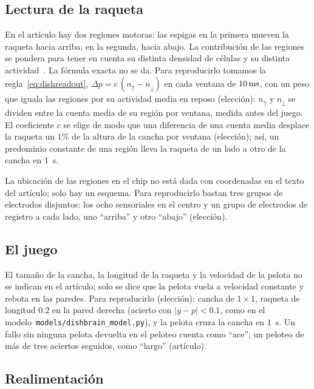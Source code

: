\subsection*{Lectura de la raqueta}

En el artículo hay dos regiones motoras: las espigas en la primera mueven la raqueta hacia arriba; en la segunda, hacia abajo. La contribución de las regiones se pondera para tener en cuenta su distinta densidad de células y su distinta actividad~\cite{Kagan2022}. La fórmula exacta no se da. Para reproducirlo tomamos la regla~\eqref{eq:dishreadout}, $\Delta p=c\,(n_\uparrow-n_\downarrow)$ en cada ventana de $10\,\text{ms}$, con un peso que iguala las regiones por su actividad media en reposo (elección): $n_\uparrow$ y $n_\downarrow$ se dividen entre la cuenta media de su región por ventana, medida antes del juego. El coeficiente $c$ se elige de modo que una diferencia de una cuenta media desplace la raqueta un $1\%$ de la altura de la cancha por ventana (elección); así, un predominio constante de una región lleva la raqueta de un lado a otro de la cancha en $1$~s.

La ubicación de las regiones en el chip no está dada con coordenadas en el texto del artículo; solo hay un esquema. Para reproducirlo bastan tres grupos de electrodos disjuntos: los ocho sensoriales en el centro y un grupo de electrodos de registro a cada lado, uno “arriba” y otro “abajo” (elección).

\subsection*{El juego}

El tamaño de la cancha, la longitud de la raqueta y la velocidad de la pelota no se indican en el artículo; solo se dice que la pelota vuela a velocidad constante y rebota en las paredes. Para reproducirlo (elección): cancha de $1\times1$, raqueta de longitud $0.2$ en la pared derecha (acierto con $|y-p|<0.1$, como en el modelo~\texttt{models/dishbrain\_model.py}), y la pelota cruza la cancha en $1$~s. Un fallo sin ninguna pelota devuelta en el peloteo cuenta como “ace”; un peloteo de más de tres aciertos seguidos, como “largo” (artículo).

\subsection*{Realimentación}

